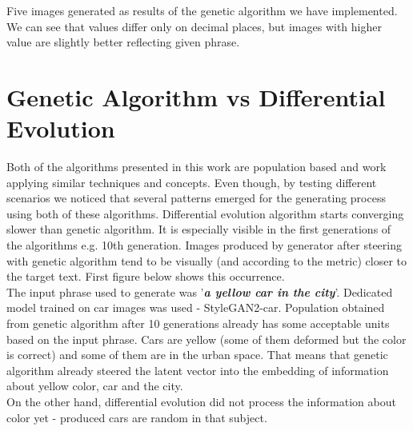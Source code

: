 \documentclass[12pt,a4paper,openany]{book}
\begin{document}
\noindent Five images generated as results of the genetic algorithm we have implemented. We can see that values differ only on decimal places, but images with higher value are slightly better reflecting given phrase.\\

\section{Genetic Algorithm vs Differential Evolution}

Both of the algorithms presented in this work are population based and work applying similar techniques and concepts. Even though, by testing different scenarios we noticed that several patterns emerged for the generating process using both of these algorithms. 
Differential evolution algorithm starts converging slower than genetic algorithm. It is especially visible in the first generations of the algorithms e.g. 10th generation. Images produced by generator after steering with genetic algorithm tend to be visually (and according to the metric) closer to the target text. First figure below shows this occurrence.\\
The input phrase used to generate was '\textit{\textbf{a yellow car in the city}}'. Dedicated model trained on car images was used - StyleGAN2-car. Population obtained from genetic algorithm after 10 generations already has some acceptable units based on the input phrase. Cars are yellow (some of them deformed but the color is correct) and some of them are in the urban space. That means that genetic algorithm already steered the latent vector into the embedding of information about yellow color, car and the city.\\
On the other hand, differential evolution did not process the information about color yet - produced cars are random in that subject.

\newpage
\end{document}
